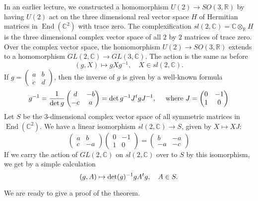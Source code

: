 \documentclass{amsart}
\def\op#1{{\operatorname{#1}}}
\newcommand{\ring}[1]{\mathbb{#1}}
\def\t#1{\hbox{}^t#1}
\begin{document}
In an earlier lecture, we constructed a homomorphism $U(2)\to
SO(3,\ring{R})$ by having $U(2)$ act on the three dimensional real
vector space $H$ of Hermitian matrices in $\op{End}(\ring{C}^2)$ with
trace zero.  The complexification
$sl(2,\ring{C})=\ring{C}\otimes_{\ring{R}} H$ is the three dimensional
complex vector space of all $2$ by $2$
matrices of trace zero.  Over the complex vector space, the
homomorphism $U(2)\to SO(3,\ring{R})$ extends to a homomorphism
$GL(2,\ring{C})\to GL(3,\ring{C})$.  The action is the same as before
\[
(g,X)\mapsto g X g^{-1},\quad X\in sl(2,\ring{C}).
\]
If $g = \begin{pmatrix} a& b\\ c & d\end{pmatrix}$, then the inverse
of $g$ is given by a well-known formula
\[
g^{-1} = \frac{1}{\det{g}}\begin{pmatrix} d & - b \\ -c & a\end{pmatrix} 
= \det g^{-1} J \t{g} J^{-1}, \quad
\hbox{ where } J = \begin{pmatrix} 0 & -1 \\ 1 &0 \end{pmatrix}
\]
Let $S$ be the $3$-dimensional complex vector space of all symmetric matrices in $\op{End}(\ring{C}^2)$.
We have a linear isomorphism $sl(2,\ring{C})\to S$, given by $X\mapsto X J$:
\[
\begin{pmatrix} a& b\\c & -a\end{pmatrix} \begin{pmatrix} 0& -1 \\1 &0\end{pmatrix} = 
\begin{pmatrix} b & -a \\ -a & -c \end{pmatrix}
\]
If we carry the action of $GL(2,\ring{C})$ on $sl(2,\ring{C})$
over to $S$ by this isomorphism, we get by a simple calculation
\[
(g,A) \mapsto \det(g)^{-1} g A \t{g},\quad A \in S.
\]

We are ready to give a proof of the theorem.
\end{document}
